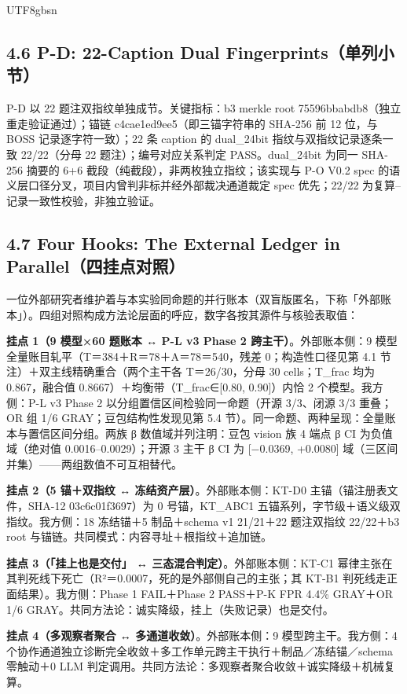 \documentclass[10pt,a4paper]{article}
\begin{document}
\begin{CJK}{UTF8}{gbsn}
\subsection*{4.6 P-D: 22-Caption Dual Fingerprints（单列小节）}P-D 以 22 题注双指纹单独成节。关键指标：b3 merkle root 75596bbabdb8（独立重走验证通过）；锚链 c4cae1ed9ee5（即三锚字符串的 SHA-256 前 12 位，与 BOSS 记录逐字符一致）；22 条 caption 的 dual\_24bit 指纹与双指纹记录逐条一致 22/22（分母 22 题注）；编号对应关系判定 PASS。dual\_24bit 为同一 SHA-256 摘要的 6+6 截段（纯截段），非两枚独立指纹；该实现与 P-O V0.2 spec 的语义层口径分叉，项目内曾判非标并经外部裁决通道裁定 spec 优先；22/22 为复算–记录一致性校验，非独立验证。

\subsection*{4.7 Four Hooks: The External Ledger in Parallel（四挂点对照）}一位外部研究者维护着与本实验同命题的并行账本（双盲版匿名，下称「外部账本」）。四组对照构成方法论层面的呼应，数字各按其源件与核验表取值：

\textbf{挂点 1（9 模型×60 题账本 ↔ P-L v3 Phase 2 跨主干）}。外部账本侧：9 模型全量账目轧平（T＝384＋R＝78＋A＝78＝540，残差 0；构造性口径见第 4.1 节注）＋双主线精确重合（两个主干各 T＝26/30，分母 30 cells；T\_frac 均为 0.867，融合值 0.8667）＋均衡带（T\_frac∈[0.80, 0.90]）内恰 2 个模型。我方侧：P-L v3 Phase 2 以分组置信区间检验同一命题（开源 3/3、闭源 3/3 重叠；OR 组 1/6 GRAY；豆包结构性发现见第 5.4 节）。同一命题、两种呈现：全量账本与置信区间分组。两族 β 数值域并列注明：豆包 vision 族 4 端点 β CI 为负值域（绝对值 0.0016–0.0029）；开源 3 主干 β CI 为 [−0.0369, +0.0080] 域（三区间并集）——两组数值不可互相替代。

\textbf{挂点 2（5 锚＋双指纹 ↔ 冻结资产层）}。外部账本侧：KT-D0 主锚（锚注册表文件，SHA-12 03c6c01f3697）为 0 号锚，KT\_ABC1 五锚系列，字节级＋语义级双指纹。我方侧：18 冻结锚＋5 制品＋schema v1 21/21＋22 题注双指纹 22/22＋b3 root 与锚链。共同模式：内容寻址＋根指纹＋追加链。

\textbf{挂点 3（「挂上也是交付」 ↔ 三态混合判定）}。外部账本侧：KT-C1 幂律主张在其判死线下死亡（R²＝0.0007，死的是外部侧自己的主张；其 KT-B1 判死线走正面结果）。我方侧：Phase 1 FAIL＋Phase 2 PASS＋P-K FPR 4.4\% GRAY＋OR 1/6 GRAY。共同方法论：诚实降级，挂上（失败记录）也是交付。

\textbf{挂点 4（多观察者聚合 ↔ 多通道收敛）}。外部账本侧：9 模型跨主干。我方侧：4 个协作通道独立诊断完全收敛＋多工作单元跨主干执行＋制品／冻结锚／schema 零触动＋0 LLM 判定调用。共同方法论：多观察者聚合收敛＋诚实降级＋机械复算。



\end{CJK}
\end{document}
